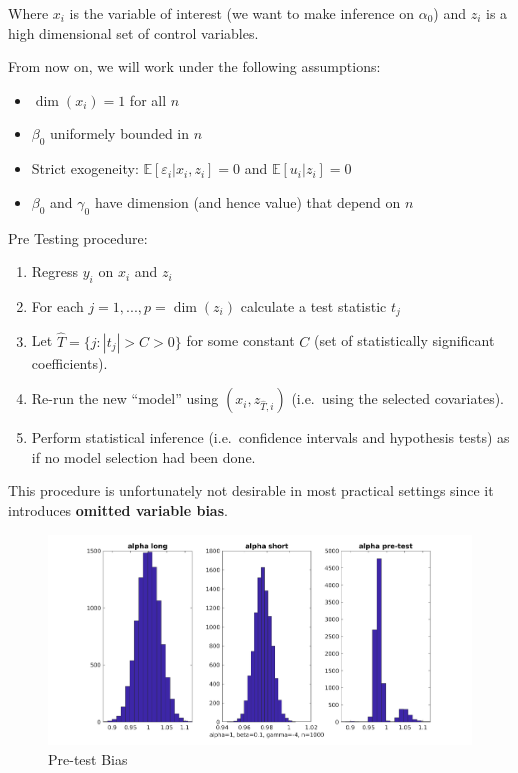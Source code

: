 \documentclass[12pt,]{book}
\providecommand{\tightlist}{%
  \setlength{\itemsep}{0pt}\setlength{\parskip}{0pt}}
\begin{document}
Where \(x_i\) is the variable of interest (we want to make inference on \(\alpha_0\)) and \(z_i\) is a high dimensional set of control variables.

From now on, we will work under the following assumptions:

\begin{itemize}
\tightlist
\item
  \(\dim(x_i)=1\) for all \(n\)
\item
  \(\beta_0\) uniformely bounded in \(n\)
\item
  Strict exogeneity: \(\mathbb E[\varepsilon_i | x_i, z_i] = 0\) and \(\mathbb E[u_i | z_i] = 0\)
\item
  \(\beta_0\) and \(\gamma_0\) have dimension (and hence value) that depend on \(n\)
\end{itemize}

Pre Testing procedure:

\begin{enumerate}
\def\labelenumi{\arabic{enumi}.}
\tightlist
\item
  Regress \(y_i\) on \(x_i\) and \(z_i\)
\item
  For each \(j = 1, ..., p = \dim(z_i)\) calculate a test statistic \(t_j\)
\item
  Let \(\hat{T} = \{ j: |t_j| > C > 0 \}\) for some constant \(C\) (set of statistically significant coefficients).
\item
  Re-run the new ``model'' using \((x_i, z_{\hat{T},i})\) (i.e.~using the selected covariates).
\item
  Perform statistical inference (i.e.~confidence intervals and hypothesis tests) as if no model selection had been done.
\end{enumerate}

This procedure is unfortunately not desirable in most practical settings since it introduces \textbf{omitted variable bias}.

\begin{figure}
\centering
\includegraphics{figures/Fig_621.png}
\caption{Pre-test Bias}
\end{figure}
\end{document}
